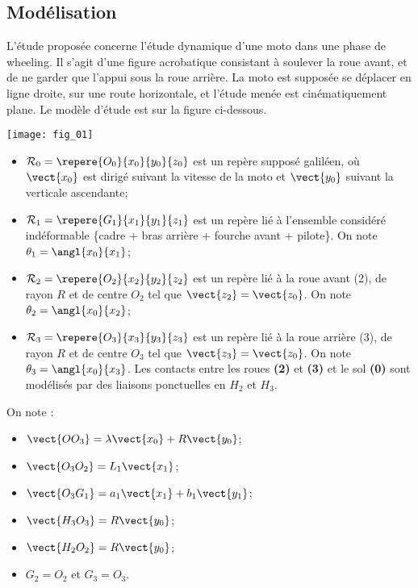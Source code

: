 \def\columnseprulecolor{\color{ocre}}
\setlength{\columnseprule}{0.4pt} 


\setcounter{exo}{0}

\ifprof
\else

\ifprof
\else
\begin{multicols}{2}
\fi

\subsection*{Modélisation}
L'étude proposée concerne l'étude dynamique d'une moto dans une phase de wheeling. Il s’agit d’une figure acrobatique consistant à soulever la roue avant, et de ne garder que l’appui sous la roue arrière. La moto est supposée se déplacer en ligne droite, sur une route horizontale, et l'étude menée est cinématiquement plane. Le modèle d'étude est sur la figure ci-dessous.

\begin{center}
\texttt{[image: fig\_01]}
\end{center}
\begin{itemize}
\item $\mathcal{R}_0=\repere{O_0}{x_0}{y_0}{z_0}$ est un repère supposé galiléen, où $\vect{x_0}$ est dirigé suivant la vitesse de la moto et $\vect{y_0}$ suivant la verticale ascendante;
\item $\mathcal{R}_1=\repere{G_1}{x_1}{y_1}{z_1}$ est un repère lié à l'ensemble considéré indéformable \{cadre + bras arrière + fourche avant + pilote\}. On note $\theta_1=\angl{x_0}{x_1}$;
\item $\mathcal{R}_2=\repere{O_2}{x_2}{y_2}{z_2}$ est un repère lié à la roue avant (2), de rayon $R$ et de centre $O_2$ tel que $\vect{z_2}=\vect{z_0}$. On note $\theta_2=\angl{x_0}{x_2}$;
\item $\mathcal{R}_3=\repere{O_3}{x_3}{y_3}{z_3}$ est un repère lié à la roue arrière (3), de rayon $R$ et de centre $O_3$ tel que $\vect{z_3}=\vect{z_0}$. On note $\theta_3=\angl{x_0}{x_3}$. Les contacts entre les roues \textbf{(2)} et \textbf{(3)} et le sol \textbf{(0)} sont modélisés par des liaisons ponctuelles en $H_2$ et $H_3$.
\end{itemize}

On note :
\begin{itemize}
\item $\vect{OO_3} = \lambda \vect{x_0}+R\vect{y_0}$;
\item $\vect{O_3O_2} = L_1\vect{x_1}$;
\item $\vect{O_3G_1} = a_1\vect{x_1}+b_1\vect{y_1}$;
\item $\vect{H_3O_3} = R \vect{y_0}$;
\item $\vect{H_2O_2} = R \vect{y_0}$;
\item $G_2 = O_2$ et $G_3 = O_3$.
\end{itemize}


\end{multicols}
